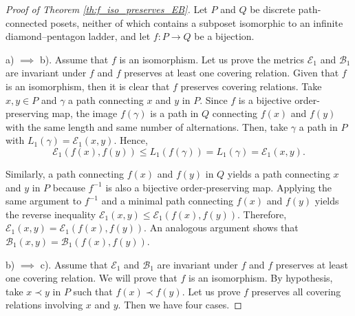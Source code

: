 \documentclass{article}[12pt]
\theoremstyle{exampstyle}
\theoremstyle{remark}
\newcommand{\B}{\mathcal{B}}
\newcommand{\E}{\mathcal{E}}
\begin{document}
\begin{proof}[Proof of Theorem \ref{th:f_iso_preserves_EB}]

    Let $P$ and $Q$ be discrete path-connected posets, neither of which contains a subposet isomorphic to an infinite diamond–pentagon ladder, and let $f: P \to Q$ be a bijection.
    
    a) $\implies$ b). Assume that $f$ is an isomorphism. Let us prove the metrics $\E_1$ and $\B_1$ are invariant under $f$ and $f$ preserves at least one covering relation.
    Given that $f$ is an isomorphism, then it is clear that $f$ preserves covering relations. Take $x,y \in P$ and $\gamma$ a path connecting $x$ and $y$ in $P$. Since $f$ is a bijective order-preserving map, the image $f(\gamma)$ is a path in $Q$ connecting $f(x)$ and $f(y)$ with the same length and same number of alternations. Then, take $\gamma$ a path in $P$ with $L_1(\gamma) = \E_1(x,y)$.  Hence,
    \[\E_1(f(x),f(y)) \leq L_1(f(\gamma)) = L_1(\gamma) = \E_1(x,y).\]
    
    Similarly, a path connecting $f(x)$ and $f(y)$ in $Q$ yields a path connecting $x$ and $y$  in $P$ because $f^{-1}$ is also a bijective order-preserving map. Applying the same argument to $f^{-1}$ and a minimal path connecting $f(x)$ and $f(y)$ yields the reverse inequality \mbox{$\E_1(x,y) \leq \E_1(f(x),f(y))$}.  Therefore, $\E_1(x,y) = \E_1(f(x),f(y))$.  An analogous argument shows that $\B_1(x,y) = \B_1(f(x),f(y))$.

    b) $\implies$ c). Assume that $\E_1$ and $\B_1$ are invariant under $f$ and $f$ preserves at least one covering relation. We will prove that $f$ is an isomorphism. By hypothesis, take $x \prec y$ in $P$ such that $f(x) \prec f(y)$. Let us prove $f$ preserves all covering relations involving $x$ and $y$. Then we have four cases.
    

\end{proof}
\end{document}
